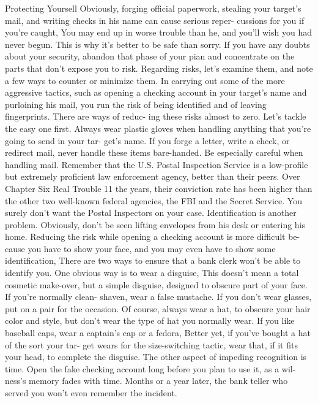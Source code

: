 \documentclass{book}
\begin{document}
Protecting Yoursell 
Obviously, forging official paperwork, stealing your target's 
mail, and writing checks in his name can cause serious reper- 
cussions for you if you're caught, You may end up in worse 
trouble than he, and you'll wish you had never begun. 
This is why it’s better to be safe than sorry. If you have any 
doubts about your security, abandon that phase of your pian 
and concentrate on the parts that don't expose you to risk. 
Regarding risks, let's examine them, and note a few ways to 
counter or minimize them. In carrying out some of the more 
aggressive tactics, such as opening a checking account in your 
target's name and purloining his mail, you run the risk of being 
identified and of leaving fingerprints. There are ways of reduc- 
ing these risks almost to zero. 
Let's tackle the easy one first. Always wear plastic gloves 
when handling anything that you're going to send in your tar- 
get's name. If you forge a letter, write a check, or redirect mail, 
never handle these items bare-handed. 
Be especially careful when handling mail. Remember that 
the U.S. Postal Inspection Service is a low-profile but extremely 
proficient law enforcement agency, better than their peers. Over 
Chapter Six 
Real Trouble 
11 
the years, their conviction rate has been higher than the other 
two well-known federal agencies, the FBI and the Secret 
Service. You surely don't want the Postal Inspectors on your 
case. 
Identification is another problem. Obviously, don't be seen 
lifting envelopes from his desk or entering his home. Reducing 
the risk while opening a checking account is more difficult be- 
cause you have to show your face, and you may even have to 
show some identification, 
There are two ways to ensure that a bank clerk won't be able 
to identify you. One obvious way is to wear a disguise, This 
doesn't mean a total cosmetic make-over, but a simple disguise, 
designed to obscure part of your face. If you're normally clean- 
shaven, wear a false mustache. If you don't wear glasses, put on 
a pair for the occasion. Of course, always wear a hat, to obscure 
your hair color and style, but don't wear the type of hat you 
normally wear. If you like baseball caps, wear a captain's cap or 
a fedora, Better yet, if you've bought a hat of the sort your tar- 
get wears for the size-switching tactic, wear that, if it fits your 
head, to complete the disguise. 
The other aspect of impeding recognition is time. Open the 
fake checking account long before you plan to use it, as a wil- 
ness's memory fades with time. Months or a year later, the bank 
teller who served you won't even remember the incident. 
\end{document}
